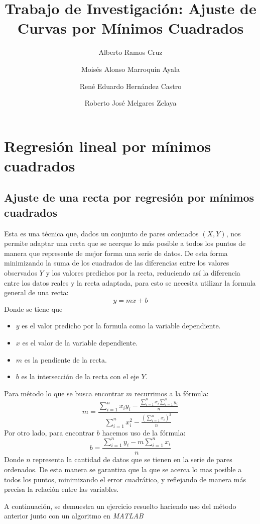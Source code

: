 \documentclass[11pt,letterpaper]{article}
\begin{document}
\title{Trabajo de Investigación: Ajuste de Curvas por Mínimos Cuadrados}

\author{
	Alberto Ramos Cruz
	\and Moisés Alonso Marroquín Ayala
	\and René Eduardo Hernández Castro
	\and Roberto José Melgares Zelaya
}
\maketitle


\section{Regresión lineal por mínimos cuadrados}
\subsection{Ajuste de una recta por regresión por mínimos cuadrados}
Esta es una técnica que, dados un conjunto de pares ordenados $(X,Y)$, nos permite adaptar una recta que se acerque lo más posible a todos los puntos de manera que represente de mejor forma una serie de datos. De esta forma minimizando la suma de los cuadrados de las diferencias entre los valores observados $Y$ y los valores predichos por la recta, reduciendo así la diferencia entre los datos reales y la recta adaptada, para esto se necesita utilizar la formula general de una recta: $$ y = mx + b$$
Donde se tiene que 
\begin{itemize}
	\item $y$ es el valor predicho por la formula como la variable dependiente.
	\item $x$ es el valor de la variable dependiente.
	\item $m$ es la pendiente de la recta.
	\item $b$ es la intersección de la recta con el eje $Y$.
\end{itemize}
Para método lo que se busca encontrar $m$ recurrimos a la fórmula:
\begin{equation}
m = \frac{\sum_{i=1}^{n} x_iy_i - \frac{\sum_{i=1}^{n} x_i \sum_{i=1}^{n} y_i}{n}}{\sum_{i=1}^{n} x_i^2 - \frac{(\sum_{i=1}^{n} x_i)^2}{n}}
\end{equation}
Por otro lado, para encontrar $b$ hacemos uso de la fórmula:
\begin{equation}
b = \frac{\sum_{i=1}^{n} y_i - m\sum_{i=1}^{n} x_i}{n}
\end{equation}
Donde $n$ representa la cantidad de datos que se tienen en la serie de pares ordenados. De esta manera se garantiza que la que se acerca lo mas posible a todos los puntos, minimizando el error cuadrático, y reflejando de manera más precisa la relación entre las variables.\cite{nieves2011metodos} \par A continuación, se demuestra un ejercicio resuelto haciendo uso del método anterior junto con un algoritmo en \textit{MATLAB}
\end{document}
